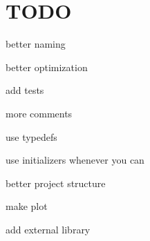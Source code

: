 \section*{T\+O\+DO}


\begin{DoxyItemize}
\item better naming
\item better optimization
\item add tests
\item more comments
\item use typedefs
\item use initializers whenever you can
\item better project structure
\item make plot
\item add external library 
\end{DoxyItemize}